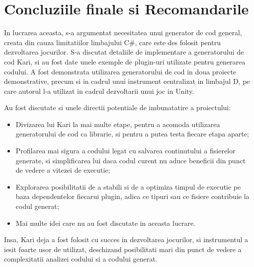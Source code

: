 \documentclass{report}
\begin{document}
\chapter{Concluziile finale si Recomandarile}

In lucrarea aceasta, s-a argumentat necesitatea unui generator de cod
general, creata din cauza limitatiilor limbajului C\#, care este des
folosit pentru dezvoltarea jocurilor. S-a discutat detaliile de
implementare a generatorului de cod Kari, si au fost date unele exemple
de plugin-uri utilizate pentru generarea codului. A fost demonstrata
utilizarea generatorului de cod in doua proiecte demonstrative, precum
si in cadrul unui instrument centralizat in limbajul D, pe care autorul
l-a utilizat in cadrul dezvoltarii unui joc in Unity.

Au fost discutate si unele directii potentiale de imbunatatire a
proiectului:

\begin{itemize}
\item
  Divizarea lui Kari la mai multe etape, pentru a acomoda utilizarea
  generatorului de cod ca librarie, si pentru a putea testa fiecare
  etapa aparte;
\item
  Profilarea mai sigura a codului legat cu salvarea continutului a
  fisierelor generate, si simplificarea lui daca codul curent nu aduce
  beneficii din punct de vedere a vitezei de executie;
\item
  Explorarea posibilitatii de a stabili si de a optimiza timpul de
  executie pe baza dependentelor fiecarui plugin, adica ce tipuri sau ce
  fisiere contribuie la codul generat;
\item
  Mai multe idei care nu au fost discutate in aceasta lucrare.
\end{itemize}

Insa, Kari deja a fost folosit cu succes in dezvoltarea jocurilor, si
instrumentul a iesit foarte usor de utilizat, deschizand posibilitati
mari din punct de vedere a complexitatii analizei codului si a codului
generat.
\end{document}
